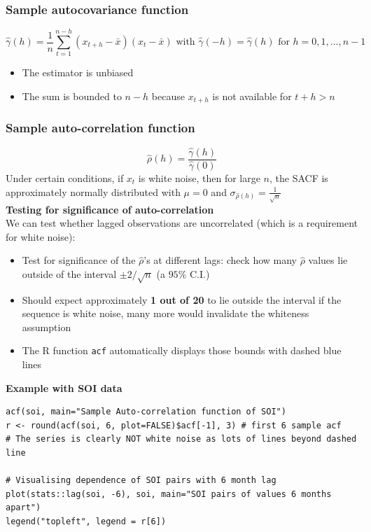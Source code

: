 \documentclass[11pt]{article}
\newcommand{\noi}{\noindent}
\begin{document}
\subsubsection{Sample autocovariance function}
$$\hat \gamma(h) = \frac{1}{n}\sum_{t=1}^{n-h}{(x_{t+h} - \bar x)(x_t - \bar x)} \text{ with } \hat \gamma(-h) = \hat \gamma(h) \text{ for } h=0,1,...,n-1$$
\begin{itemize}
    \item The estimator is unbiased
    \item The sum is bounded to $n-h$ because $x_{t+h}$ is not available for $t+h >n$
\end{itemize}
\subsubsection{Sample auto-correlation function}
$$\hat \rho(h) = \frac{\hat \gamma(h)}{\hat \gamma(0)}$$
\noi Under certain conditions, if $x_t$ is white noise, then for large $n$, the SACF is approximately normally distributed with $\mu=0$ and $\sigma_{\hat \rho(h)} = \frac{1}{\sqrt{n}}$ \\

\noi \textbf{Testing for significance of auto-correlation} \\
\noi We can test whether lagged observations are uncorrelated (which is a requirement for white noise):
\begin{itemize}
    \item Test for significance of the $\hat \rho$'s at different lags: check how many $\hat \rho$ values lie outside of the interval $\pm2/\sqrt n$ (a $95\%$ C.I.)
    \item Should expect approximately \textbf{1 out of 20} to lie outside the interval if the sequence is white noise, many more would invalidate the whiteness assumption
    \item The R function \texttt{acf} automatically displays those bounds with dashed blue lines
\end{itemize} \phantom{i}

\noi \textbf{Example with SOI data}
\begin{lstlisting}
acf(soi, main="Sample Auto-correlation function of SOI")
r <- round(acf(soi, 6, plot=FALSE)$acf[-1], 3) # first 6 sample acf
# The series is clearly NOT white noise as lots of lines beyond dashed line

# Visualising dependence of SOI pairs with 6 month lag
plot(stats::lag(soi, -6), soi, main="SOI pairs of values 6 months apart")
legend("topleft", legend = r[6])
\end{lstlisting}
\end{document}
